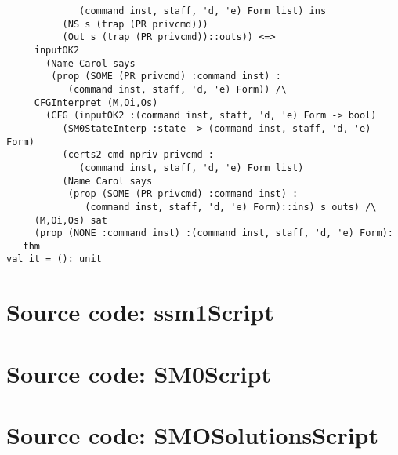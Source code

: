 \documentclass{report}
\begin{document}
\begin{session}
\begin{scriptsize}
\begin{verbatim}
             (command inst, staff, 'd, 'e) Form list) ins
          (NS s (trap (PR privcmd)))
          (Out s (trap (PR privcmd))::outs)) <=>
     inputOK2
       (Name Carol says
        (prop (SOME (PR privcmd) :command inst) :
           (command inst, staff, 'd, 'e) Form)) /\
     CFGInterpret (M,Oi,Os)
       (CFG (inputOK2 :(command inst, staff, 'd, 'e) Form -> bool)
          (SM0StateInterp :state -> (command inst, staff, 'd, 'e) Form)
          (certs2 cmd npriv privcmd :
             (command inst, staff, 'd, 'e) Form list)
          (Name Carol says
           (prop (SOME (PR privcmd) :command inst) :
              (command inst, staff, 'd, 'e) Form)::ins) s outs) /\
     (M,Oi,Os) sat
     (prop (NONE :command inst) :(command inst, staff, 'd, 'e) Form):
   thm
val it = (): unit

\end{verbatim}
  \end{scriptsize}
\end{session}





\appendix{}

\chapter{Source code: ssm1Script}
\label{cha:source-code-1}


\chapter{Source code: SM0Script}
\label{cha:source-code-2}


\chapter{Source code: SMOSolutionsScript}
\label{cha:source-code-3}

\end{document}
